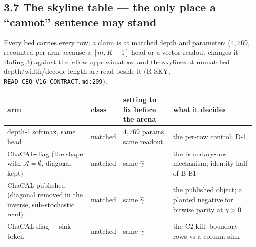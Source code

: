\documentclass[11pt,a4paper]{article}
\newcounter{none}                 %
\theoremstyle{plain}
\theoremstyle{definition}
\theoremstyle{remark}
\begin{document}
\subsection{3.7 The skyline table --- the only place a ``cannot''
sentence may
stand}\label{the-skyline-table-the-only-place-a-cannot-sentence-may-stand}

Every bed carries every row; a claim is at matched depth and parameters
(\(4{,}769\), recounted per arm because a \([m,K+1]\) head or a vector
readout changes it --- Ruling 3) against the fellow approximators, and
the skylines at unmatched depth/width/decode length are read beside it
(R-SKY, \texttt{READ\ CEQ\_V16\_CONTRACT.md:209}).

{\def\LTcaptype{none} %
\begin{longtable}[]{@{}
  >{\raggedright\arraybackslash}p{}
  >{\raggedright\arraybackslash}p{}
  >{\raggedright\arraybackslash}p{}
  >{\raggedright\arraybackslash}p{}@{}}
\toprule\noalign{}
\begin{minipage}[b]{\linewidth}\raggedright
arm
\end{minipage} & \begin{minipage}[b]{\linewidth}\raggedright
class
\end{minipage} & \begin{minipage}[b]{\linewidth}\raggedright
setting to fix before the arena
\end{minipage} & \begin{minipage}[b]{\linewidth}\raggedright
what it decides
\end{minipage} \\
\midrule\noalign{}
\endhead
\bottomrule\noalign{}
\endlastfoot
depth-1 softmax, same head & matched & \(4{,}769\) params, same readout
& the per-row control; D-1 \\
ChaCAL-diag (the shape with \(\mathcal A=\emptyset\), diagonal kept) &
matched & same \(\hat\gamma\) & the boundary-row mechanism; identity
half of B-E1 \\
ChaCAL-published (diagonal removed in the inverse, sub-stochastic read)
& matched & same \(\hat\gamma\) & the published object; a planted
negative for bitwise parity at \(\gamma>0\) \\
ChaCAL-diag + sink token & matched & same \(\hat\gamma\) & the C2 kill:
boundary rows vs a column sink \\

\end{longtable}}
\end{document}
